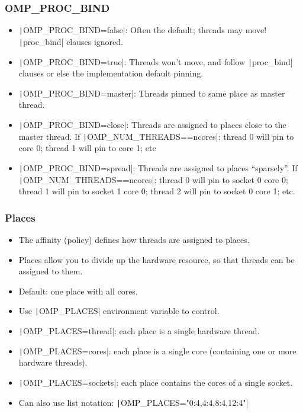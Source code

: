 \documentclass{beamer}
\begin{document}
\begin{frame}
\frametitle{OMP\_PROC\_BIND}
\begin{itemize}
  \item \texttt|OMP_PROC_BIND=false|: Often the default; threads may move! \texttt|proc_bind| clauses ignored.
  \item \texttt|OMP_PROC_BIND=true|: Threads won't move, and follow \texttt|proc_bind| clauses or else the implementation default pinning.
  \item \texttt|OMP_PROC_BIND=master|: Threads pinned to same place as master thread.
  \item \texttt|OMP_PROC_BIND=close|: Threads are assigned to places close to the master thread.
  If \texttt|OMP_NUM_THREADS==ncores|: thread 0 will pin to core 0; thread 1 will pin to core 1; etc
  \item \texttt|OMP_PROC_BIND=spread|: Threads are assigned to places ``sparsely''.
  If \texttt|OMP_NUM_THREADS==ncores|: thread 0 will pin to socket 0 core 0; thread 1 will pin to socket 1 core 0; thread 2 will pin to socket 0 core 1; etc.
\end{itemize}
\end{frame}

\begin{frame}
\frametitle{Places}
\begin{itemize}
  \item The affinity (policy) defines how threads are assigned to places.
  \item Places allow you to divide up the hardware resource, so that threads can be assigned to them.
  \item Default: one place with all cores.
  \item Use \texttt|OMP_PLACES| environment variable to control.
  \item \texttt|OMP_PLACES=thread|: each place is a single hardware thread.
  \item \texttt|OMP_PLACES=cores|: each place is a single core (containing one or more hardware threads).
  \item \texttt|OMP_PLACES=sockets|: each place contains the cores of a single socket.
  \item Can also use list notation: \texttt|OMP_PLACES="{0:4},{4:4},{8:4},{12:4}"|
\end{itemize}
\end{frame}
\end{document}
